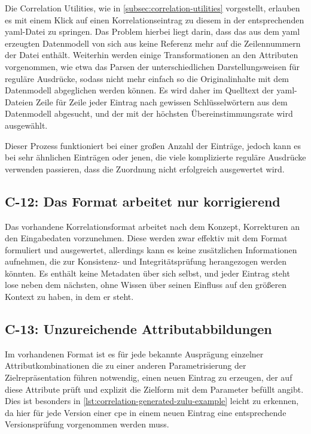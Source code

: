 Die Correlation Utilities, wie in \autoref{subsec:correlation-utilities} vorgestellt, erlauben es mit einem Klick auf einen Korrelationseintrag zu diesem in der entsprechenden \acrshort{yaml}-Datei zu springen.
Das Problem hierbei liegt darin, dass das aus dem \acrshort{yaml} erzeugten Datenmodell von sich aus keine Referenz mehr auf die Zeilennummern der Datei enthält.
Weiterhin werden einige Transformationen an den Attributen vorgenommen, wie etwa das Parsen der unterschiedlichen Darstellungsweisen für reguläre Ausdrücke, sodass nicht mehr einfach so die Originalinhalte mit dem Datenmodell abgeglichen werden können.
Es wird daher im Quelltext der \acrshort{yaml}-Dateien Zeile für Zeile jeder Eintrag nach gewissen Schlüsselwörtern aus dem Datenmodell abgesucht, und der mit der höchsten Übereinstimmungsrate wird ausgewählt.

Dieser Prozess funktioniert bei einer großen Anzahl der Einträge, jedoch kann es bei sehr ähnlichen Einträgen oder jenen, die viele komplizierte reguläre Ausdrücke verwenden passieren, dass die Zuordnung nicht erfolgreich ausgewertet wird.

\subsection{C-12: Das Format arbeitet nur korrigierend}\label{subsec:c-12-format-nur-korrigierend}

Das vorhandene Korrelationsformat arbeitet nach dem Konzept, Korrekturen an den Eingabedaten vorzunehmen.
Diese werden zwar effektiv mit dem Format formuliert und ausgewertet, allerdings kann es keine zusätzlichen Informationen aufnehmen, die zur Konsistenz- und Integritätsprüfung herangezogen werden könnten.
Es enthält keine Metadaten über sich selbst, und jeder Eintrag steht lose neben dem nächsten, ohne Wissen über seinen Einfluss auf den größeren Kontext zu haben, in dem er steht.

\subsection{C-13: Unzureichende Attributabbildungen}\label{subsec:c-13-attribut-abbildung-unzureichend}

Im vorhandenen Format ist es für jede bekannte Ausprägung einzelner Attributkombinationen die zu einer anderen Parametrisierung der Zielrepräsentation führen notwendig, einen neuen Eintrag zu erzeugen, der auf diese Attribute prüft und explizit die Zielform mit dem Parameter befüllt angibt.
Dies ist besonders in \autoref{lst:correlation-generated-zulu-example} leicht zu erkennen, da hier für jede Version einer \acrshort{cpe} in einem neuen Eintrag eine entsprechende Versionsprüfung vorgenommen werden muss.

